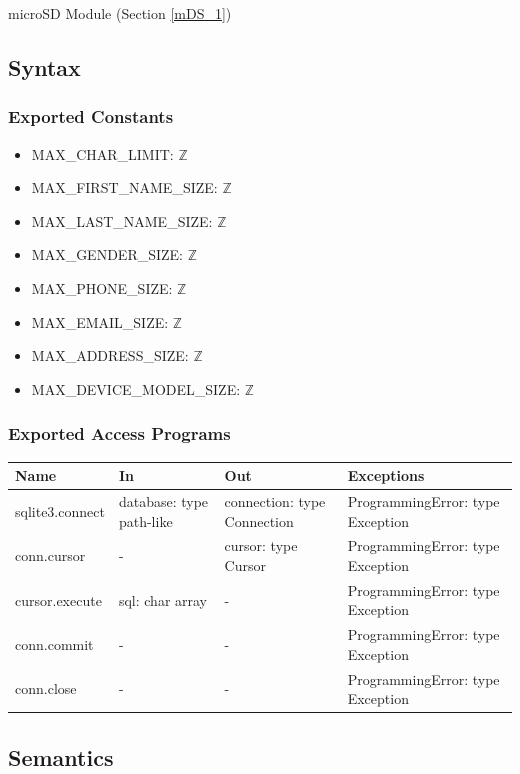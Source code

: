 \documentclass[12pt, titlepage]{article}
\begin{document}
microSD Module (Section \ref{mDS_1})   %

\subsection{Syntax}

\subsubsection{Exported Constants}

\begin{itemize}
\item MAX\_CHAR\_LIMIT: $\mathbb{Z}$
\item MAX\_FIRST\_NAME\_SIZE: $\mathbb{Z}$
\item MAX\_LAST\_NAME\_SIZE: $\mathbb{Z}$
\item MAX\_GENDER\_SIZE: $\mathbb{Z}$
\item MAX\_PHONE\_SIZE: $\mathbb{Z}$
\item MAX\_EMAIL\_SIZE: $\mathbb{Z}$
\item MAX\_ADDRESS\_SIZE: $\mathbb{Z}$
\item MAX\_DEVICE\_MODEL\_SIZE: $\mathbb{Z}$
\end{itemize}

\subsubsection{Exported Access Programs}

\begin{center}
\begin{tabular}{p{4cm} p{4cm} p{3.5cm} p{3.6cm}}
\hline
\textbf{Name} & \textbf{In} & \textbf{Out} & \textbf{Exceptions} \\
\hline
sqlite3.connect & database: type path-like & connection: type Connection & ProgrammingError: type Exception \\
conn.cursor & - & cursor: type Cursor & ProgrammingError: type Exception \\
cursor.execute & sql: char array & - & ProgrammingError: type Exception \\
conn.commit & - & - & ProgrammingError: type Exception \\
conn.close & - & - & ProgrammingError: type Exception \\
\hline
\end{tabular}
\end{center}

\subsection{Semantics}
\end{document}
